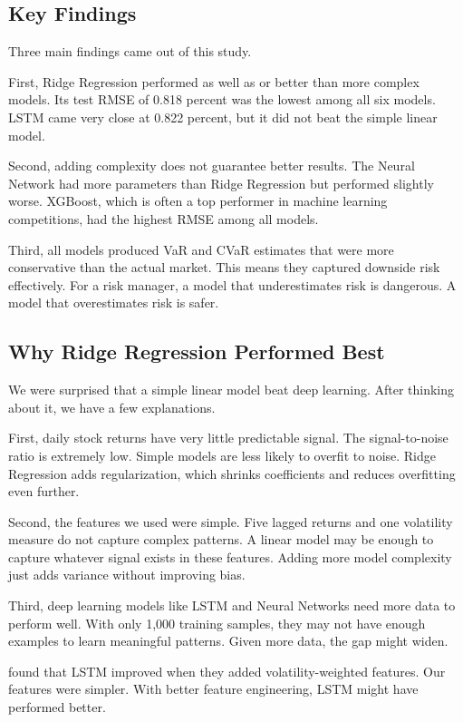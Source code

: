 \documentclass[12pt,a4paper]{article}
\begin{document}
\subsection{Key Findings}
Three main findings came out of this study.

First, Ridge Regression performed as well as or better than more complex models. Its test RMSE of 0.818 percent was the lowest among all six models. LSTM came very close at 0.822 percent, but it did not beat the simple linear model.

Second, adding complexity does not guarantee better results. The Neural Network had more parameters than Ridge Regression but performed slightly worse. XGBoost, which is often a top performer in machine learning competitions, had the highest RMSE among all models.

Third, all models produced VaR and CVaR estimates that were more conservative than the actual market. This means they captured downside risk effectively. For a risk manager, a model that underestimates risk is dangerous. A model that overestimates risk is safer.

\subsection{Why Ridge Regression Performed Best}
We were surprised that a simple linear model beat deep learning. After thinking about it, we have a few explanations.

First, daily stock returns have very little predictable signal. The signal-to-noise ratio is extremely low. Simple models are less likely to overfit to noise. Ridge Regression adds regularization, which shrinks coefficients and reduces overfitting even further.

Second, the features we used were simple. Five lagged returns and one volatility measure do not capture complex patterns. A linear model may be enough to capture whatever signal exists in these features. Adding more model complexity just adds variance without improving bias.

Third, deep learning models like LSTM and Neural Networks need more data to perform well. With only 1,000 training samples, they may not have enough examples to learn meaningful patterns. Given more data, the gap might widen.

\citet{abang2025} found that LSTM improved when they added volatility-weighted features. Our features were simpler. With better feature engineering, LSTM might have performed better.
\end{document}
